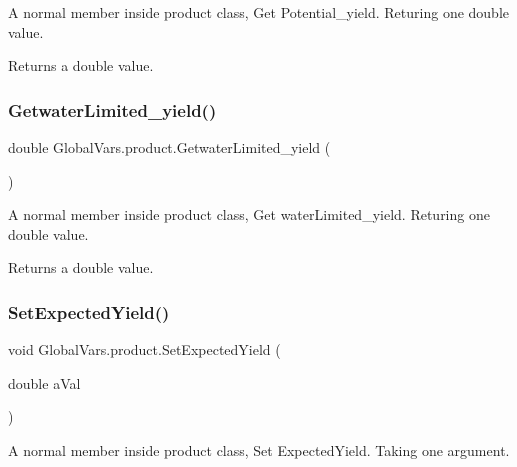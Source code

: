 A normal member inside product class, Get Potential\+\_\+yield. Returing one double value. 

\begin{DoxyReturn}{Returns}
a double value. 
\end{DoxyReturn}
\mbox{\label{class_global_vars_1_1product_afc503db364ad2560853f82273ff428f5}} 
\subsubsection{\texorpdfstring{GetwaterLimited\_yield()}{GetwaterLimited\_yield()}}
{\footnotesize\ttfamily double Global\+Vars.\+product.\+Getwater\+Limited\+\_\+yield (\begin{DoxyParamCaption}{ }\end{DoxyParamCaption})\hspace{0.3cm}{\ttfamily [inline]}}



A normal member inside product class, Get water\+Limited\+\_\+yield. Returing one double value. 

\begin{DoxyReturn}{Returns}
a double value. 
\end{DoxyReturn}
\mbox{\label{class_global_vars_1_1product_ac7eacd118e8a93c7423d551e7489109d}} 
\subsubsection{\texorpdfstring{SetExpectedYield()}{SetExpectedYield()}}
{\footnotesize\ttfamily void Global\+Vars.\+product.\+Set\+Expected\+Yield (\begin{DoxyParamCaption}\item[{double}]{a\+Val }\end{DoxyParamCaption})\hspace{0.3cm}{\ttfamily [inline]}}



A normal member inside product class, Set Expected\+Yield. Taking one argument. 


